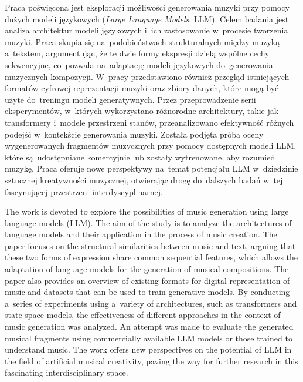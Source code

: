 \documentclass[data-science]{agh-wi} %
\author{Filip Ręka}
\begin{document}
\frontmatter %
\maketitle %

\begin{abstractPL}
    Praca poświęcona jest eksploracji możliwości generowania muzyki przy pomocy dużych modeli językowych (\textit{Large Language Models}, LLM). Celem badania jest analiza architektur modeli językowych i~ich zastosowanie w~procesie tworzenia muzyki. Praca skupia się na~podobieństwach strukturalnych między muzyką a~tekstem, argumentując, że te dwie formy ekspresji dzielą wspólne cechy sekwencyjne,  co~pozwala na~adaptację modeli językowych do~generowania muzycznych kompozycji. W~pracy przedstawiono również przegląd istniejących formatów cyfrowej reprezentacji muzyki oraz zbiory danych, które mogą być użyte do~treningu modeli generatywnych. Przez przeprowadzenie serii eksperymentów, w~których wykorzystano różnorodne architektury, takie jak transformery i~modele przestrzeni stanów, przeanalizowano efektywność różnych podejść w~kontekście generowania muzyki. Została podjęta próba oceny wygenerowanych fragmentów muzycznych przy pomocy dostępnych modeli LLM, które są~udostępniane komercyjnie lub zostały wytrenowane, aby rozumieć muzykę. Praca oferuje nowe perspektywy na~temat potencjału LLM w~dziedzinie sztucznej kreatywności muzycznej, otwierając drogę do~dalszych badań w~tej fascynującej przestrzeni interdyscyplinarnej.
\end{abstractPL}
\begin{abstractEN}
    The work is devoted to explore the possibilities of music generation using large language models (LLM). The aim of the study is to analyze the architectures of language models and their application in the process of music creation. The paper focuses on the structural similarities between music and text, arguing that these two forms of expression share common sequential features, which allows the adaptation of language models for the generation of musical compositions. The paper also provides an overview of existing formats for digital representation of music and datasets that can be used to train generative models. By conducting a~series of experiments using a~variety of architectures, such as transformers and state space models, the effectiveness of different approaches in the context of music generation was analyzed. An attempt was made to evaluate the generated musical fragments using commercially available LLM models or those trained to understand music. The work offers new perspectives on the potential of LLM in the field of artificial musical creativity, paving the way for further research in this fascinating interdisciplinary space.
\end{abstractEN}
\end{document}
